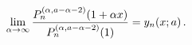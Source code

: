 \[\lim_{\alpha\to\infty}\frac{\mathop{P^{(\alpha,a-\alpha-2)}_{n}\/}\nolimits\!%
\left(1+\alpha x\right)}{\mathop{P^{(\alpha,a-\alpha-2)}_{n}\/}\nolimits\!%
\left(1\right)}=\mathop{y_{n}\/}\nolimits\!\left(x;a\right).\]